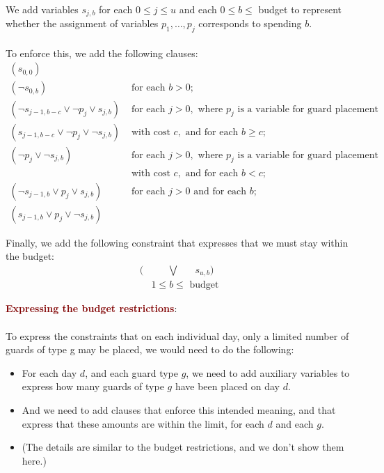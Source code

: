 We add variables $s_{j, b}$ for each $0 \leq j \leq u$ and each $0 \leq b \leq$ budget to represent whether the assignment of variables $p_{1}, \ldots, p_{j}$ corresponds to spending $b$. \\
\\
To enforce this, we add the following clauses:
$$
\begin{array}{ll}
\left(s_{0,0}\right) &  \\
\left(\neg s_{0, b}\right) & \text { for each } b>0 ;  \\
\left(\neg s_{j-1, b-c} \vee \neg p_{j} \vee s_{j, b}\right) & \text { for each } j>0, \text { where } p_{j} \text { is a variable for guard placement }  \\
\left(s_{j-1, b-c} \vee \neg p_{j} \vee \neg s_{j, b}\right) & \text { with cost } c, \text { and for each } b \geq c ;  \\
\left(\neg p_{j} \vee \neg s_{j, b}\right) & \text { for each } j>0, \text { where } p_{j} \text { is a variable for guard placement }  \\
& \text { with cost } c, \text { and for each } b<c ; \\
\left(\neg s_{j-1, b} \vee p_{j} \vee s_{j, b}\right) & \text { for each } j>0 \text { and for each } b ; \\
\left(s_{j-1, b} \vee p_{j} \vee \neg s_{j, b}\right) & 
\end{array}
$$

\vspace{0.5cm}

Finally, we add the following constraint that expresses that we must stay within the budget:
\begin{align*}
    (&\;\;\;\;\;\; \bigvee \;\;\;\;\;\; s_{u,b}) \\
    &1 \leq b \leq \text { budget }
\end{align*} 

\newpage

{\Large \textbf{\textcolor{Maroon}{Expressing the budget restrictions}}:} \\
\\
To express the constraints that on each individual day, only a limited number of guards of type g may be placed, we would need to do the following:
\begin{itemize}
    \setlength\itemsep{0em}
    \item For each day $d$, and each guard type $g$, we need to add auxiliary variables to express how many guards of type $g$ have been placed on day $d$.
    \item And we need to add clauses that enforce this intended meaning, and that express that these amounts are within the limit, for each $d$ and each $g$.
    \item (The details are similar to the budget restrictions, and we don’t show them here.)
\end{itemize}

